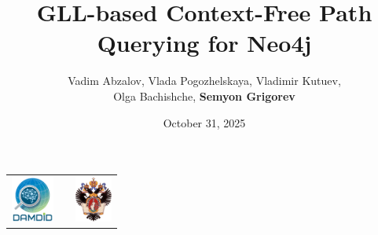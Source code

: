 \documentclass[xcolor=table,aspectratio=169]{beamer}
\title[GLL-based CFPQ for Neo4j]{GLL-based Context-Free Path Querying for Neo4j}
\institute[SPbSU]{
Saint Petersburg State University
}
\author[Semyon Grigorev]{Vadim Abzalov, Vlada Pogozhelskaya, Vladimir Kutuev, \\ Olga Bachishche, \textbf{Semyon Grigorev}}
\date{October 31, 2025}
\begin{document}
{
\begin{frame}[fragile]
  \begin{table}
  \centering
  \begin{tabularx}{\linewidth}{XcX}
    \includegraphics[height=1.5cm]{pictures/damdid_logo.png} \hfill
    & \hfill %
    & \hfill \includegraphics[height=1.5cm]{pictures/SPbGU_Logo.png}
  \end{tabularx}
  \end{table}
  \titlepage
\end{frame}
}
\end{document}
